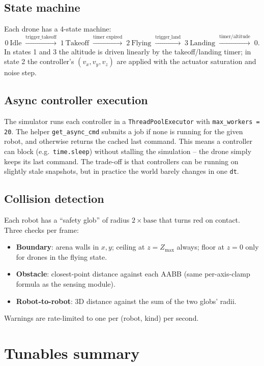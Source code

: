 \documentclass[11pt,a4paper]{article}
\newcommand{\code}[1]{\texttt{#1}}
\begin{document}
\subsection{State machine}
Each drone has a 4-state machine:
\[
    0\ \text{Idle} \;\xrightarrow{\text{trigger\_takeoff}}\;
    1\ \text{Takeoff} \;\xrightarrow{\text{timer expired}}\;
    2\ \text{Flying} \;\xrightarrow{\text{trigger\_land}}\;
    3\ \text{Landing} \;\xrightarrow{\text{timer/altitude}}\; 0.
\]
In states 1 and 3 the altitude is driven linearly by the takeoff/landing
timer; in state 2 the controller's $(v_x, v_y, v_z)$ are applied with the
actuator saturation and noise step.

\subsection{Async controller execution}
The simulator runs each controller in a \code{ThreadPoolExecutor} with
\code{max\_workers = 20}. The helper \code{get\_async\_cmd} submits a job if
none is running for the given robot, and otherwise returns the cached last
command. This means a controller can block (e.g.\ \code{time.sleep}) without
stalling the simulation -- the drone simply keeps its last command. The
trade-off is that controllers can be running on slightly stale snapshots, but
in practice the world barely changes in one \code{dt}.

\subsection{Collision detection}
Each robot has a ``safety glob'' of radius $2 \times \text{base}$ that turns
red on contact. Three checks per frame:
\begin{itemize}[leftmargin=1.4em]
  \item \textbf{Boundary}: arena walls in $x, y$; ceiling at $z = Z_{\max}$
        always; floor at $z = 0$ only for drones in the flying state.
  \item \textbf{Obstacle}: closest-point distance against each AABB (same
        per-axis-clamp formula as the sensing module).
  \item \textbf{Robot-to-robot}: 3D distance against the sum of the two
        globs' radii.
\end{itemize}
Warnings are rate-limited to one per (robot, kind) per second.

\section{Tunables summary}
\end{document}
